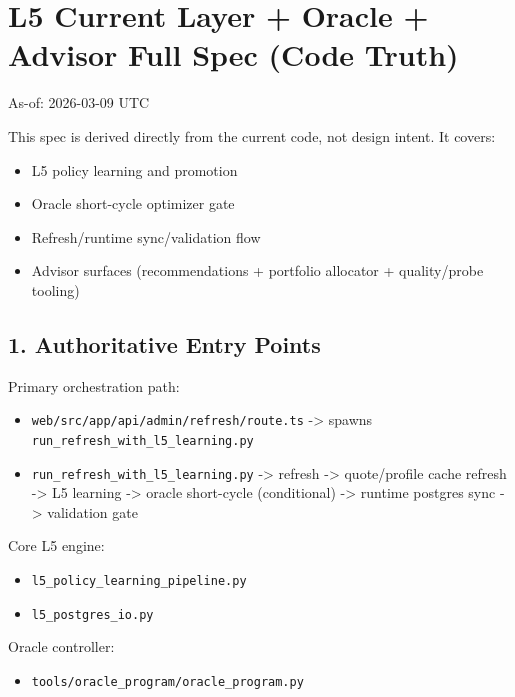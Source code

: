 \documentclass[
]{article}
\author{}
\date{}
\providecommand{\tightlist}{%
  \setlength{\itemsep}{0pt}\setlength{\parskip}{0pt}}
\begin{document}
\section{L5 Current Layer + Oracle + Advisor Full Spec (Code
Truth)}\label{l5-current-layer--oracle--advisor-full-spec-code-truth}

As-of: 2026-03-09 UTC

This spec is derived directly from the current code, not design intent.
It covers:

\begin{itemize}
\tightlist
\item
  L5 policy learning and promotion
\item
  Oracle short-cycle optimizer gate
\item
  Refresh/runtime sync/validation flow
\item
  Advisor surfaces (recommendations + portfolio allocator +
  quality/probe tooling)
\end{itemize}

\subsection{1. Authoritative Entry
Points}\label{1-authoritative-entry-points}

Primary orchestration path:

\begin{itemize}
\tightlist
\item
  \texttt{web/src/app/api/admin/refresh/route.ts} -\textgreater{} spawns
  \texttt{run\_refresh\_with\_l5\_learning.py}
\item
  \texttt{run\_refresh\_with\_l5\_learning.py} -\textgreater{} refresh
  -\textgreater{} quote/profile cache refresh -\textgreater{} L5
  learning -\textgreater{} oracle short-cycle (conditional)
  -\textgreater{} runtime postgres sync -\textgreater{} validation gate
\end{itemize}

Core L5 engine:

\begin{itemize}
\tightlist
\item
  \texttt{l5\_policy\_learning\_pipeline.py}
\item
  \texttt{l5\_postgres\_io.py}
\end{itemize}

Oracle controller:

\begin{itemize}
\tightlist
\item
  \texttt{tools/oracle\_program/oracle\_program.py}
\end{itemize}
\end{document}
